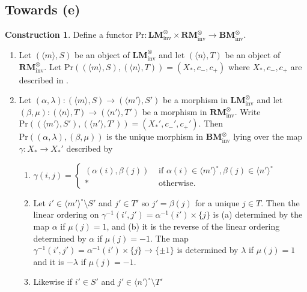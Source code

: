 \documentclass{article}
\theoremstyle{definition}
\newtheorem{construction}[theorem]{Construction}
\begin{document}
\subsection{Towards (e)}
\begin{construction}
    Define a functor $ \mathrm{Pr}\colon \mathbf{LM}_{\mathrm{inv}}^\otimes \times \mathbf{RM}_{\mathrm{inv}}^\otimes \to \mathbf{BM}_{\mathrm{inv}}^\otimes $. 
\begin{enumerate}[label=(\arabic*)]
    \item Let $ (\langle m\rangle, S) $ be an object of $ \mathbf{LM}_{\mathrm{inv}}^\otimes $ and let $ ( \langle n \rangle, T) $ be an object of $ \mathbf{RM}_{\mathrm{inv}}^\otimes $. 
    Let $ \mathrm{Pr}((\langle m\rangle, S), (\langle n\rangle, T)) = (X_*, c_{-}, c_{+}) $ where $ X_*, c_{-}, c_{+} $ are described in \cite[Construction 4.3.2.1(1)]{LurHA}. 
    \item Let $ (\alpha, \lambda) \colon (\langle m\rangle, S) \to (\langle m'\rangle, S') $ be a morphism in $ \mathbf{LM}_{\mathrm{inv}}^\otimes $ and let $ (\beta, \mu) \colon (\langle n\rangle, T) \to (\langle n'\rangle, T') $ be a morphism in $ \mathbf{RM}_{\mathrm{inv}}^\otimes $. 
    Write $ \mathrm{Pr}((\langle m'\rangle, S'), (\langle n'\rangle, T')) = (X_*', c_{-}', c_{+}') $. 
    Then $ \mathrm{Pr}\left((\alpha, \lambda),(\beta, \mu)\right) $ is the unique morphism in $ \mathbf{BM}_{\mathrm{inv}}^\otimes $ lying over the map $ \gamma \colon X_* \to X_*' $ described by 
    \begin{enumerate}[label=(\roman*)]
        \item $ \displaystyle \gamma(i,j) = \begin{cases}
            (\alpha(i), \beta(j)) & \text{ if } \alpha(i) \in \langle m' \rangle^\circ, \beta(j) \in \langle n' \rangle^\circ \\
            * & \text{ otherwise. }
        \end{cases} $
        \item Let $ i' \in \langle m' \rangle^\circ \setminus S' $ and $ j' \in T' $ so $ j' = \beta(j) $ for a unique $ j \in T $. 
        Then the linear ordering on $ \gamma^{-1}(i', j') = \alpha^{-1}(i') \times \{j\} $ is (a) determined by the map $ \alpha $ if $ \mu(j) = 1 $, and (b) it is the reverse of the linear ordering determined by $ \alpha $ if $ \mu(j) = -1 $. 
        The map $ \gamma^{-1}(i', j') = \alpha^{-1}(i') \times \{j\} \to \{\pm 1\} $ is determined by $ \lambda $ if $ \mu(j) = 1 $ and it is $ -\lambda $ if $ \mu(j ) = -1 $. 
        \item Likewise if $ i' \in S' $ and $ j' \in \langle n' \rangle^\circ \setminus T' $ 

\end{enumerate}
\end{enumerate}
\end{construction}
\end{document}
